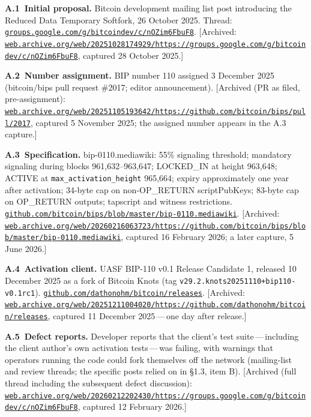 \documentclass[11pt, twoside, openright]{book}
\newcommand{\reqitem}[2]{\medskip\noindent\textbf{#1\ #2}\quad\ignorespaces}
\newcommand{\sect}[1]{\S#1}
\begin{document}
\reqitem{A.1}{Initial proposal.} Bitcoin development mailing list post introducing the Reduced Data Temporary Softfork, 26 October 2025. Thread: \href{https://groups.google.com/g/bitcoindev/c/nOZim6FbuF8}{\nolinkurl{groups.google.com/g/bitcoindev/c/nOZim6FbuF8}}. [Archived: \href{https://web.archive.org/web/20251028174929/https://groups.google.com/g/bitcoindev/c/nOZim6FbuF8}{\nolinkurl{web.archive.org/web/20251028174929/https://groups.google.com/g/bitcoindev/c/nOZim6FbuF8}}, captured 28 October 2025.]

\reqitem{A.2}{Number assignment.} BIP number 110 assigned 3 December 2025 (bitcoin/bips pull request \#2017; editor announcement). [Archived (PR as filed, pre-assignment): \href{https://web.archive.org/web/20251105193642/https://github.com/bitcoin/bips/pull/2017}{\nolinkurl{web.archive.org/web/20251105193642/https://github.com/bitcoin/bips/pull/2017}}, captured 5 November 2025; the assigned number appears in the A.3 capture.]

\reqitem{A.3}{Specification.} bip-0110.mediawiki: 55\% signaling threshold; mandatory signaling during blocks 961{,}632--963{,}647; LOCKED\_IN at height 963{,}648; ACTIVE at \texttt{max\_activation\_height} 965{,}664; expiry approximately one year after activation; 34-byte cap on non-OP\_RETURN scriptPubKeys; 83-byte cap on OP\_RETURN outputs; tapscript and witness restrictions. \href{https://github.com/bitcoin/bips/blob/master/bip-0110.mediawiki}{\nolinkurl{github.com/bitcoin/bips/blob/master/bip-0110.mediawiki}}. [Archived: \href{https://web.archive.org/web/20260216063723/https://github.com/bitcoin/bips/blob/master/bip-0110.mediawiki}{\nolinkurl{web.archive.org/web/20260216063723/https://github.com/bitcoin/bips/blob/master/bip-0110.mediawiki}}, captured 16 February 2026; a later capture, 5 June 2026.]

\reqitem{A.4}{Activation client.} UASF BIP-110 v0.1 Release Candidate 1, released 10 December 2025 as a fork of Bitcoin Knots (tag \texttt{v29.2.knots20251110+bip110-v0.1rc1}). \href{https://github.com/dathonohm/bitcoin/releases}{\nolinkurl{github.com/dathonohm/bitcoin/releases}}. [Archived: \href{https://web.archive.org/web/20251211004020/https://github.com/dathonohm/bitcoin/releases}{\nolinkurl{web.archive.org/web/20251211004020/https://github.com/dathonohm/bitcoin/releases}}, captured 11 December 2025\,---\,one day after release.]

\reqitem{A.5}{Defect reports.} Developer reports that the client's test suite\,---\,including the client author's own activation tests\,---\,was failing, with warnings that operators running the code could fork themselves off the network (mailing-list and review threads; the specific posts relied on in \sect{1.3}, item B). [Archived (full thread including the subsequent defect discussion): \href{https://web.archive.org/web/20260212202430/https://groups.google.com/g/bitcoindev/c/nOZim6FbuF8}{\nolinkurl{web.archive.org/web/20260212202430/https://groups.google.com/g/bitcoindev/c/nOZim6FbuF8}}, captured 12 February 2026.]
\end{document}
